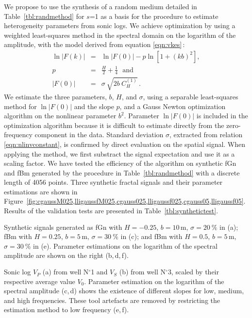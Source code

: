 We propose to use the synthesis of a random medium 
detailed in Table~\ref{tbl:randmethod} for $s$=1
as a basis for the procedure to estimate heterogeneity parameters from sonic logs.
We achieve optimization by using a weighted least-squares method in the spectral domain
on the logarithm of the amplitude, with the model derived from equation \ref{eqn:vkes}\,:
\begin{eqnarray}
\ln|F(k)| & = & \ln|F(0)| - p\ln\left[1+(kb)^2\right],\label{eqn:nlinvmethod} \\
p & = & \frac{H}{2}+\frac{1}{4}\ \ \ \mbox{and} \\
|F(0)| & = & \sigma~\sqrt{2b~C^{(1)}_{H}}\,. \label{eqn:nlinvconstant}
\end{eqnarray}
We estimate the three parameters, $b$, $H$, and $\sigma$, using a separable least-squares method 
\cite[]{Golub_P73} for $\ln|F(0)|$ and the slope $p$, and a Gauss Newton optimization algorithm on the nonlinear parameter $b^2$.
Parameter $\ln|F(0)|$ is included in the optimization algorithm
because it is difficult to estimate directly from the zero-frequency component in the data.
Standard deviation $\sigma$, extracted from relation \ref{eqn:nlinvconstant}, is confirmed by direct evaluation on the spatial signal.
When applying the method, we first substract the signal expectation and use it as a scaling factor.
We have tested the efficiency of the algorithm on synthetic fGn and fBm 
generated by the procedure in Table~\ref{tbl:randmethod} with a discrete length of 4056 points.
Three synthetic fractal signals and their parameter estimations are shown 
in Figure~\ref{fig:cgaussM025,lligaussfM025,cgauss025,lligaussf025,cgauss05,lligaussf05}.
Results of the validation tests are presented in Table~\ref{tbl:synthetictest}.

{Synthetic signals generated as fGn with $H=-0.25$, $b=10$\,m, $\sigma=20~\%$ in (a); 
fBm with $H=0.25$, $b=5$\,m, $\sigma=30~\%$ in (c); and fBm with $H=0.5$, $b=5$\,m, $\sigma=30~\%$ in (e).
Parameter estimations on the logarithm of the spectral amplitude are shown on the right (b,\,d,\,f).}

{Sonic log $V_P$ (a) from well N$^{\circ}$1 and $V_S$ (b) from well N$^{\circ}$3, scaled by their respective average value $V_0$.
Parameter estimation on the logarithm of the spectral amplitude (c,\,d) shows the existence of different slopes 
for low, medium, and high frequencies.
These tool artefacts are removed by restricting the estimation method to low frequency (e,\,f).}



